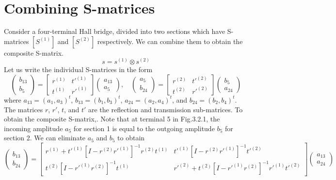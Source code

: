 \documentclass[11pt,a4paper]{book}
\theoremstyle{plain}
\theoremstyle{definition}
\theoremstyle{remark}
\begin{document}
\section{Combining S-matrices}
Consider a four-terminal Hall bridge, divided into two sections which have S-matrices $[S^{(1)}]$ and $[S^{(2)}]$ respectively. We can combine them to obtain the composite S-matrix.
\begin{equation}
    s = s^{(1)} \otimes s^{(2)}
\end{equation}
Let us write the individual S-matrices in the form
\begin{equation}
    \begin{pmatrix}
        b_{13} \\
        b_5
    \end{pmatrix}
    =
    \begin{bmatrix}
        r^{(1)} & t'^{(1)} \\
        t^{(1)} & r'^{(1)}
    \end{bmatrix}
    \begin{pmatrix}
        a_{13} \\
        a_5
    \end{pmatrix}, \quad
    \begin{pmatrix}
        a_5 \\
        b_{24}
    \end{pmatrix}
    =
    \begin{bmatrix}
        r^{(2)} & t'^{(2)} \\
        t^{(2)} & r'^{(2)}
    \end{bmatrix}
    \begin{pmatrix}
        b_5 \\
        a_{24}
    \end{pmatrix}
\end{equation}
where $a_{13} = (a_1, a_3)^t$, $b_{13} = (b_1, b_3)^t$, $a_{24} = (a_2, a_4)^t$, and $b_{24} = (b_2, b_4)^t$. The matrices $r$, $r'$, $t$, and $t'$ are the reflection and transmission sub-matrices. To obtain the composite S-matrix,. Note that at terminal 5 in Fig.3.2.1, the incoming amplitude $a_5$ for section 1 is equal to the outgoing amplitude $b_5$ for section 2. We can eliminate $a_5$ and $b_5$ to obtain
\begin{equation}
    \begin{pmatrix}
        b_{13} \\
        b_{24}
    \end{pmatrix}
    =
    \begin{bmatrix}
        r^{(1)} + t'^{(1)} [I - r^{(2)} r'^{(1)}]^{-1} r^{(2)} t^{(1)} & t'^{(1)} [I - r^{(2)} r'^{(1)}]^{-1} t'^{(2)} \\
        t^{(2)} [I - r'^{(1)} r^{(2)}]^{-1} t^{(1)} & r'^{(2)} + t^{(2)} [I - r'^{(1)} r^{(2)}]^{-1} r'^{(1)} t'^{(2)}
    \end{bmatrix}
    \begin{pmatrix}
        a_{13} \\
        a_{24}
    \end{pmatrix}
\end{equation}
\end{document}
